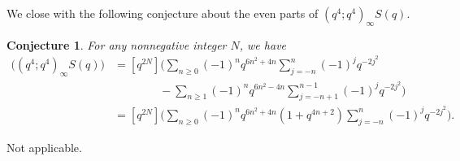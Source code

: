 \documentclass[reqno]{amsart}
\theoremstyle{definition}
\theoremstyle{plain}
\newtheorem{conjecture} {Conjecture}
\theoremstyle{remark}
\numberwithin{equation}{section}
\begin{document}
We close with the following conjecture about the even parts of $(q^4;q^4)_\infty S(q)$.
\begin{conjecture}\label{conj-5}
For any nonnegative integer $N$, we have
\begin{align*}
[q^{2N}] \Big((q^4;q^4)_\infty S(q) \Big) &= [q^{2N}] \Big( \sum_{n\geq 0}(-1)^n q^{6n^2+4n}\sum_{j=-n}^n (-1)^j q^{-2j^2} \\
& \qquad\qquad - \sum_{n\geq 1}(-1)^n q^{6n^2-4n}\sum_{j=-n+1}^{n-1} (-1)^j q^{-2j^2} \Big) \\
&=[q^{2N}] \Big( \sum_{n\geq 0}(-1)^n q^{6n^2+4n}(1+q^{4n+2})\sum_{j=-n}^n (-1)^j q^{-2j^2} \Big).
\end{align*}
\end{conjecture}
\bigskip


Not applicable.

\bigskip
\end{document}
